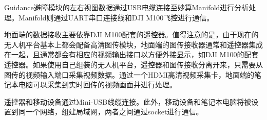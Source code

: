 Guidance避障模块的左右视图数据通过USB电缆连接至妙算Manifold进行分析处理。Manifold则通过UART串口连接线和DJI M100飞控进行通信。

地面端的数据接收主要依靠DJI M100配套的遥控器。值得注意的是，由于现在的无人机平台基本上都会配备高清图传模块，地面端的图传接收器通常和遥控器集成在一起，且通常都会有相应的视频输出接口以方便外接显示，如DJI M100的配套遥控器。如果使用自己组装的无人机平台，遥控器和图传接收分离开来，只需要从图传的视频输入端口采集视频数据。通过一个HDMI高清视频采集卡，地面端的笔记本电脑可以采集到实时回传的视频画面并进行处理。

遥控器和移动设备通过Mini-USB线缆连接。此外，移动设备和笔记本电脑将被设置到同一个网络，组建局域网，两者之间通过socket进行通信。
